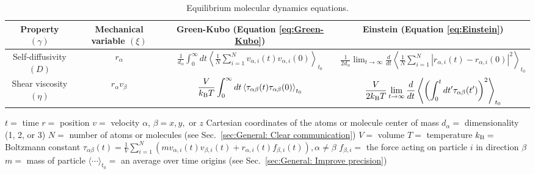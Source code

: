 \documentclass[9pt,bestpractices]{livecoms}
\begin{document}
\begin{table}[tb]
	\caption{\label{tab:EMD_equations}Equilibrium molecular dynamics equations.}

	\begin{tabular}{c c c c}
		\toprule
		Property $(\gamma)$          & Mechanical variable $(\xi)$                        & Green-Kubo (Equation \ref{eq:Green-Kubo})    & Einstein (Equation \ref{eq:Einstein})     \\
		\midrule
		Self-diffusivity $(D)$ & $r_{\alpha}$          & $ \displaystyle \frac{1}{d_\alpha} \int_{0}^{\infty}dt\left\langle \frac{1}{N} \sum_{i=1}^{N} v_{\alpha,i}(t) v_{\alpha,i}(0)\right\rangle_{t_0}$    & $ \displaystyle \frac{1}{2d_\alpha} \lim_{t\to\infty} \frac{d}{dt} \left\langle \frac{1}{N} \sum_{i=1}^{N} |r_{\alpha,i}(t)-r_{\alpha,i}(0)|^2 \right\rangle_{t_0}$   \\
		Shear viscosity $(\eta)$       & $r_\alpha v_\beta$           & $ \displaystyle \frac{V}{k_{\rm B}T} \int_{0}^{\infty}dt\left\langle \tau_{\alpha\beta}(t) \tau_{\alpha\beta}(0)\right\rangle_{t_0}$    & $ \displaystyle \frac{V}{2k_{\rm B}T} \lim_{t\to\infty} \frac{d}{dt} \left\langle \left(\int_{0}^{t}dt' \tau_{\alpha\beta}(t')\right)^2 \right\rangle_{t_0}$  \\
		\bottomrule
	\end{tabular}
	\newline
	$t=$ time \newline
	$r=$ position \newline
	$v=$ velocity \newline
	$\alpha$, $\beta = x, y, $ or $z$ Cartesian coordinates of the atoms or molecule center of mass \newline
	$d_\alpha =$ dimensionality (1, 2, or 3) \newline
	$N=$ number of atoms or molecules (see Sec.\ \ref{sec:General: Clear communication}) \newline
	$V=$ volume \newline
	$T=$ temperature \newline
	$k_{\rm B}=$ Boltzmann constant \newline
	$\tau_{\alpha\beta}(t) = \frac{1}{V} \sum_{i=1}^{N} \left( m v_{\alpha,i}(t) v_{\beta,i}(t) + r_{\alpha,i}(t) f_{\beta,i}(t) \right) , \alpha \ne \beta$ \newline
	$f_{\beta,i}=$ the force acting on particle $i$ in direction $\beta$ \newline
	$m=$ mass of particle \newline
	$\langle \cdots \rangle_{t_0}=$ an average over time origins (see Sec.\ \ref{sec:General: Improve precision})
\end{table}
\end{document}
